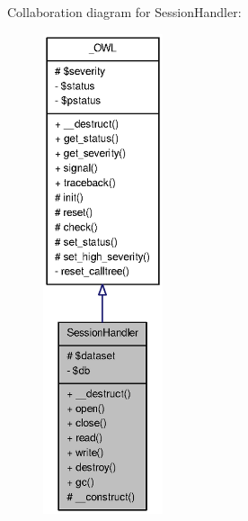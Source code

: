 Collaboration diagram for SessionHandler:\nopagebreak
\begin{figure}[H]
\begin{center}
\leavevmode
\includegraphics[height=400pt]{classSessionHandler__coll__graph}
\end{center}
\end{figure}
